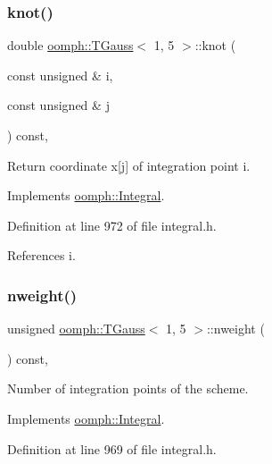 \subsubsection{\texorpdfstring{knot()}{knot()}}
{\footnotesize\ttfamily double \hyperlink{classoomph_1_1TGauss}{oomph\+::\+T\+Gauss}$<$ 1, 5 $>$\+::knot (\begin{DoxyParamCaption}\item[{const unsigned \&}]{i,  }\item[{const unsigned \&}]{j }\end{DoxyParamCaption}) const\hspace{0.3cm}{\ttfamily [inline]}, {\ttfamily [virtual]}}



Return coordinate x\mbox{[}j\mbox{]} of integration point i. 



Implements \hyperlink{classoomph_1_1Integral_a1a2122f99a87c18649bafdd9ed739758}{oomph\+::\+Integral}.



Definition at line 972 of file integral.\+h.



References i.

\mbox{\label{classoomph_1_1TGauss_3_011_00_015_01_4_ae4e019a763d30b8b9e16d55e6b139dcf}} 
\subsubsection{\texorpdfstring{nweight()}{nweight()}}
{\footnotesize\ttfamily unsigned \hyperlink{classoomph_1_1TGauss}{oomph\+::\+T\+Gauss}$<$ 1, 5 $>$\+::nweight (\begin{DoxyParamCaption}{ }\end{DoxyParamCaption}) const\hspace{0.3cm}{\ttfamily [inline]}, {\ttfamily [virtual]}}



Number of integration points of the scheme. 



Implements \hyperlink{classoomph_1_1Integral_a1a270de9d99a1fcf1d25a6c1017f65fa}{oomph\+::\+Integral}.



Definition at line 969 of file integral.\+h.

